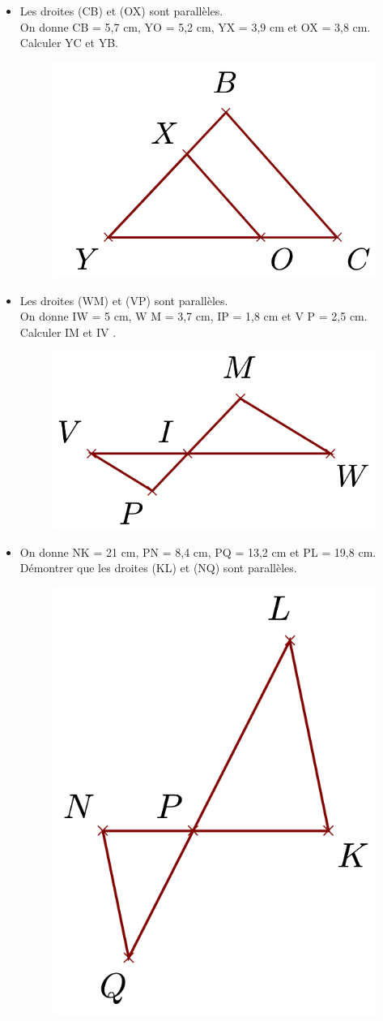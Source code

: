 \documentclass[11pt]{article}
\begin{document}
\begin{multicols}{3}

  \begin{itemize}
  \item[1.] Les droites (CB) et (OX) sont parallèles. \\
    On donne CB = 5,7 cm, YO = 5,2 cm, YX = 3,9 cm et OX = 3,8 cm.
    Calculer YC et YB.
    \begin{figure}[H]
      \centering
      \includegraphics[width=0.4\linewidth]{3xx-dm/sources/dm2/tha1.png}
    \end{figure}

  \item[2.]Les droites (WM) et (VP) sont parallèles. \\
    On donne IW = 5 cm, W M = 3,7 cm, IP = 1,8 cm et V P = 2,5 cm.
    Calculer IM et IV .
    \begin{figure}[H]
      \centering
      \includegraphics[width=0.4\linewidth]{3xx-dm/sources/dm2/tha2.png}
    \end{figure}

  \item[3.] On donne NK = 21 cm, PN = 8,4 cm, PQ = 13,2 cm et PL = 19,8 cm.\\
    Démontrer que les droites (KL) et (NQ) sont parallèles.
    \begin{figure}[H]
      \centering
      \includegraphics[width=0.4\linewidth]{3xx-dm/sources/dm2/tha3.png}
    \end{figure}
  \end{itemize}

\end{multicols}
\end{document}
